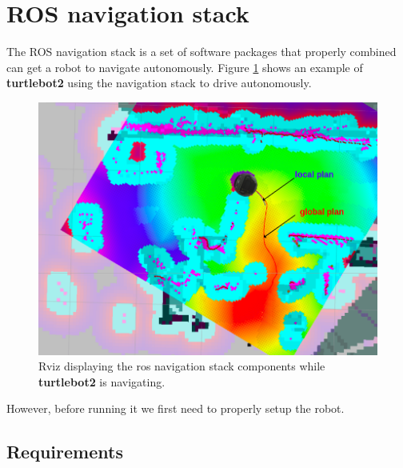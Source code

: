 \documentclass[12pt]{article}
\begin{document}
\section{ROS navigation stack}
The ROS navigation stack is a set of software packages that properly combined can get a robot to navigate autonomously.
Figure \ref{fig:plans} shows an example of \textbf{turtlebot2} using the navigation stack to drive autonomously.
\begin{figure}[!htb]
    \centering
    \includegraphics[width=\linewidth]{rviz_navigation2.png}
    \caption{Rviz displaying the ros navigation stack components while \textbf{turtlebot2} is navigating.}
    \label{fig:plans}
\end{figure}
However, before running it we first need to properly setup the robot.
\subsection{Requirements}
\end{document}
